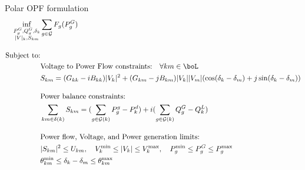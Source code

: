 \documentclass[11pt, aspectratio=169]{beamer}
\begin{document}
\begin{frame}{Polar OPF formulation}
\scriptsize
\begin{align}
\label{polar}
\inf_{\substack{P^G_g, Q^G_g, \delta_k \\ |V|_k, S_{km}}}
& \sum_{g \in \mathcal{G}} F_g(P_g^G) \\[1em]
\text{Subject to:} & \nonumber \\
& \text{Voltage to Power Flow constraints:} \quad \forall km \in \boL  \nonumber \\
& S_{km} = (G_{kk}-iB_{kk})|V_k|^2 + (G_{km}-jB_{km})|V_k||V_m|(\cos(\delta_k-\delta_m) + j\sin(\delta_k-\delta_m))  \\[1em]
& \text{Power balance constraints:} \nonumber \\
& \sum_{km \in \delta(k)}S_{km} = (\sum_{g \in \mathcal{G}(k)}P_g^g-P_k^d) + i(\sum_{g \in \mathcal{G}(k)}Q_g^G-Q_k^L) \\[1em]
& \text{Power flow, Voltage, and Power generation limits:} \nonumber \\
& |S_{km}|^2 \leq U_{km}, \quad V_k^{\text{min}} \leq |V_k| \leq V_k^{\text{max}}, \quad P_g^{\text{min}} \leq P_g^G \leq P_g^{\text{max}} \\
& \theta_{km}^{\text{min}} \leq \delta_k - \delta_m \leq \theta_{km}^{\text{max}}
\end{align}

\end{frame}
\end{document}
